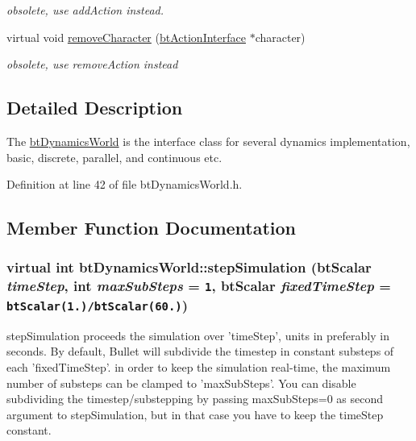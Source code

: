\begin{CompactItemize}
\begin{CompactList}\small\item\em obsolete, use addAction instead. \item\end{CompactList}\item 
\hypertarget{classbt_dynamics_world_e4daeac0b98e39a80bb960c5b995fd2a}{
virtual void \hyperlink{classbt_dynamics_world_e4daeac0b98e39a80bb960c5b995fd2a}{removeCharacter} (\hyperlink{classbt_action_interface}{btActionInterface} $\ast$character)}
\label{classbt_dynamics_world_e4daeac0b98e39a80bb960c5b995fd2a}

\begin{CompactList}\small\item\em obsolete, use removeAction instead \item\end{CompactList}\end{CompactItemize}


\subsection{Detailed Description}
The \hyperlink{classbt_dynamics_world}{btDynamicsWorld} is the interface class for several dynamics implementation, basic, discrete, parallel, and continuous etc. 

Definition at line 42 of file btDynamicsWorld.h.

\subsection{Member Function Documentation}
\hypertarget{classbt_dynamics_world_5ab26a0d6e8b2b21fbde2ed8f8dd6294}{
\subsubsection[stepSimulation]{\setlength{\rightskip}{0pt plus 5cm}virtual int btDynamicsWorld::stepSimulation (btScalar {\em timeStep}, \/  int {\em maxSubSteps} = {\tt 1}, \/  btScalar {\em fixedTimeStep} = {\tt btScalar(1.)/btScalar(60.)})}}
\label{classbt_dynamics_world_5ab26a0d6e8b2b21fbde2ed8f8dd6294}


stepSimulation proceeds the simulation over 'timeStep', units in preferably in seconds. By default, Bullet will subdivide the timestep in constant substeps of each 'fixedTimeStep'. in order to keep the simulation real-time, the maximum number of substeps can be clamped to 'maxSubSteps'. You can disable subdividing the timestep/substepping by passing maxSubSteps=0 as second argument to stepSimulation, but in that case you have to keep the timeStep constant. 


